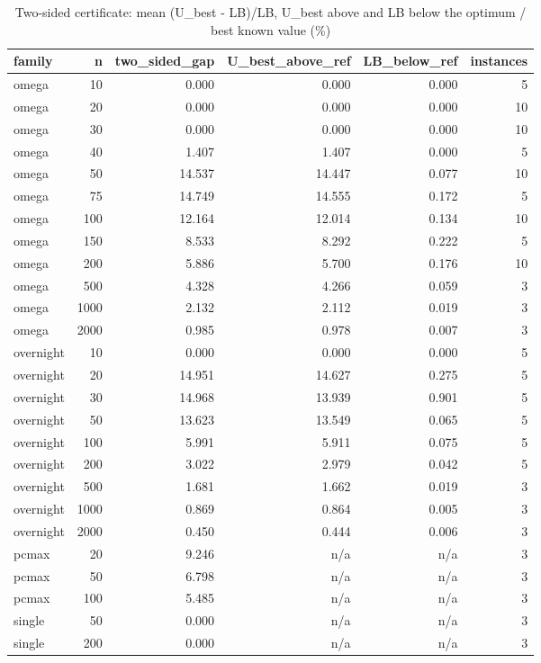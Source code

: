 \begin{table}[htbp]
\centering
\small
\caption{Two-sided certificate: mean (U\_best - LB)/LB, U\_best above and LB below the optimum / best known value (\%)}
\label{tab:E1_certificates_two_sided}
\begin{tabular}{lrrrrr}
\toprule
family & n & two\_sided\_gap & U\_best\_above\_ref & LB\_below\_ref & instances \\
\midrule
omega & 10 & 0.000 & 0.000 & 0.000 & 5 \\
omega & 20 & 0.000 & 0.000 & 0.000 & 10 \\
omega & 30 & 0.000 & 0.000 & 0.000 & 10 \\
omega & 40 & 1.407 & 1.407 & 0.000 & 5 \\
omega & 50 & 14.537 & 14.447 & 0.077 & 10 \\
omega & 75 & 14.749 & 14.555 & 0.172 & 5 \\
omega & 100 & 12.164 & 12.014 & 0.134 & 10 \\
omega & 150 & 8.533 & 8.292 & 0.222 & 5 \\
omega & 200 & 5.886 & 5.700 & 0.176 & 10 \\
omega & 500 & 4.328 & 4.266 & 0.059 & 3 \\
omega & 1000 & 2.132 & 2.112 & 0.019 & 3 \\
omega & 2000 & 0.985 & 0.978 & 0.007 & 3 \\
overnight & 10 & 0.000 & 0.000 & 0.000 & 5 \\
overnight & 20 & 14.951 & 14.627 & 0.275 & 5 \\
overnight & 30 & 14.968 & 13.939 & 0.901 & 5 \\
overnight & 50 & 13.623 & 13.549 & 0.065 & 5 \\
overnight & 100 & 5.991 & 5.911 & 0.075 & 5 \\
overnight & 200 & 3.022 & 2.979 & 0.042 & 5 \\
overnight & 500 & 1.681 & 1.662 & 0.019 & 3 \\
overnight & 1000 & 0.869 & 0.864 & 0.005 & 3 \\
overnight & 2000 & 0.450 & 0.444 & 0.006 & 3 \\
pcmax & 20 & 9.246 & n/a & n/a & 3 \\
pcmax & 50 & 6.798 & n/a & n/a & 3 \\
pcmax & 100 & 5.485 & n/a & n/a & 3 \\
single & 50 & 0.000 & n/a & n/a & 3 \\
single & 200 & 0.000 & n/a & n/a & 3 \\

\end{tabular}
\end{table}
